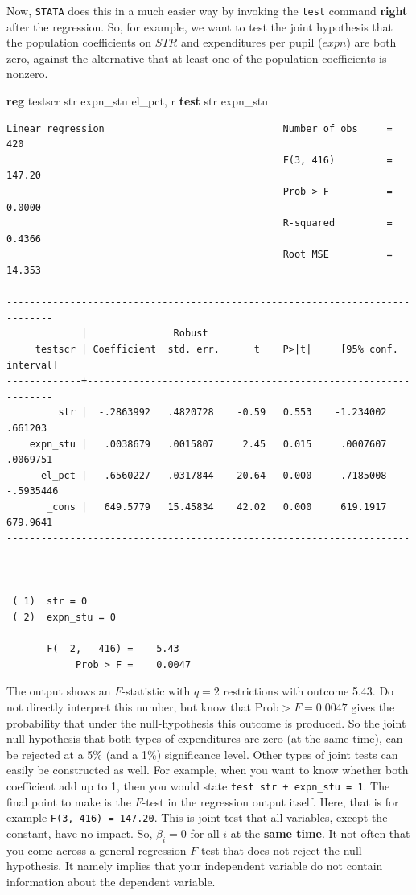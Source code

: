 \documentclass[
]{book}
\newenvironment{Shaded}{\begin{snugshade}}{\end{snugshade}}
\newcommand{\FunctionTok}[1]{\textcolor[rgb]{0.00,0.00,0.00}{#1}}
\newcommand{\KeywordTok}[1]{\textcolor[rgb]{0.13,0.29,0.53}{\textbf{#1}}}
\newcommand{\NormalTok}[1]{#1}
\begin{document}
Now, \texttt{STATA} does this in a much easier way by invoking the \texttt{test} command \textbf{right} after the regression. So, for example, we want to test the joint hypothesis that the population coefficients on \(STR\) and expenditures per pupil (\(expn\)) are both zero, against the alternative that at least one of the population coefficients is nonzero.

\begin{Shaded}
\begin{Highlighting}[]
\KeywordTok{reg}\NormalTok{ testscr str expn\_stu el\_pct, }\FunctionTok{r} 
\KeywordTok{test}\NormalTok{ str expn\_stu}
\end{Highlighting}
\end{Shaded}

\begin{verbatim}
Linear regression                               Number of obs     =        420
                                                F(3, 416)         =     147.20
                                                Prob > F          =     0.0000
                                                R-squared         =     0.4366
                                                Root MSE          =     14.353

------------------------------------------------------------------------------
             |               Robust
     testscr | Coefficient  std. err.      t    P>|t|     [95% conf. interval]
-------------+----------------------------------------------------------------
         str |  -.2863992   .4820728    -0.59   0.553    -1.234002     .661203
    expn_stu |   .0038679   .0015807     2.45   0.015     .0007607    .0069751
      el_pct |  -.6560227   .0317844   -20.64   0.000    -.7185008   -.5935446
       _cons |   649.5779   15.45834    42.02   0.000     619.1917    679.9641
------------------------------------------------------------------------------


 ( 1)  str = 0
 ( 2)  expn_stu = 0

       F(  2,   416) =    5.43
            Prob > F =    0.0047
\end{verbatim}

The output shows an \(F\)-statistic with \(q=2\) restrictions with outcome 5.43. Do not directly interpret this number, but know that \(\text{Prob} > F = 0.0047\) gives the probability that under the null-hypothesis this outcome is produced. So the joint null-hypothesis that both types of expenditures are zero (at the same time), can be rejected at a 5\% (and a 1\%) significance level. Other types of joint tests can easily be constructed as well. For example, when you want to know whether both coefficient add up to 1, then you would state \texttt{test\ str\ +\ expn\_stu\ =\ 1}. The final point to make is the \(F\)-test in the regression output itself. Here, that is for example \texttt{F(3,\ 416)\ =\ 147.20}. This is joint test that all variables, except the constant, have no impact. So, \(\beta_i = 0\) for all \(i\) at the \textbf{same time}. It not often that you come across a general regression \(F\)-test that does not reject the null-hypothesis. It namely implies that your independent variable do not contain information about the dependent variable.
\end{document}
